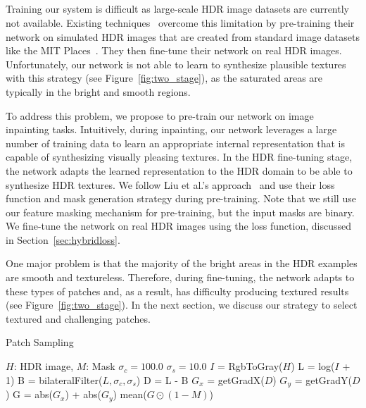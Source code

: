 \subsection{}
\label{sec:train}

Training our system is difficult as large-scale HDR image datasets are currently not available. Existing techniques~\cite{eilertsen2017hdr} overcome this limitation by pre-training their network on simulated HDR images that are created from standard image datasets like the MIT Places~\cite{zhou2014learning}. They then fine-tune their network on real HDR images. Unfortunately, our network is not able to learn to synthesize plausible textures with this strategy (see Figure~\ref{fig:two_stage}), as the saturated areas are typically in the bright and smooth regions.

To address this problem, we propose to pre-train our network on image inpainting tasks. Intuitively, during inpainting, our network leverages a large number of training data to learn an appropriate internal representation that is capable of synthesizing visually pleasing textures. In the HDR fine-tuning stage, the network adapts the learned representation to the HDR domain to be able to synthesize HDR textures. We follow Liu et al.'s approach~ and use their loss function and mask generation strategy during pre-training. Note that we still use our feature masking mechanism for pre-training, but the input masks are binary. We fine-tune the network on real HDR images using the loss function, discussed in Section~\ref{sec:hybridloss}. 

One major problem is that the majority of the bright areas in the HDR examples are smooth and textureless. Therefore, during fine-tuning, the network adapts to these types of patches and, as a result, has difficulty producing textured results (see Figure~\ref{fig:two_stage}). In the next section, we discuss our strategy to select textured and challenging patches.

\begin{algorithm}[t]
\caption{Patch Sampling}
\label{alg:patches_selection}
\begin{algorithmic}[1]
    \State $H$: HDR image, $M$: Mask
    \State $\sigma_c = 100.0$ 
    \State $\sigma_s = 10.0$ 
    \State $I$ = RgbToGray($H$)
    \State L = log($I$ + 1)
    \State B = bilateralFilter($L,\sigma_c,\sigma_s$)
    \State D = L - B
    \State $G_x$ = getGradX($D$)
    \State $G_y$ = getGradY($D$)
    \State G = abs($G_x$) + abs($G_y$)
    \State \Return mean($G \odot (1-M)$)
\EndProcedure
\end{algorithmic}
\end{algorithm}

